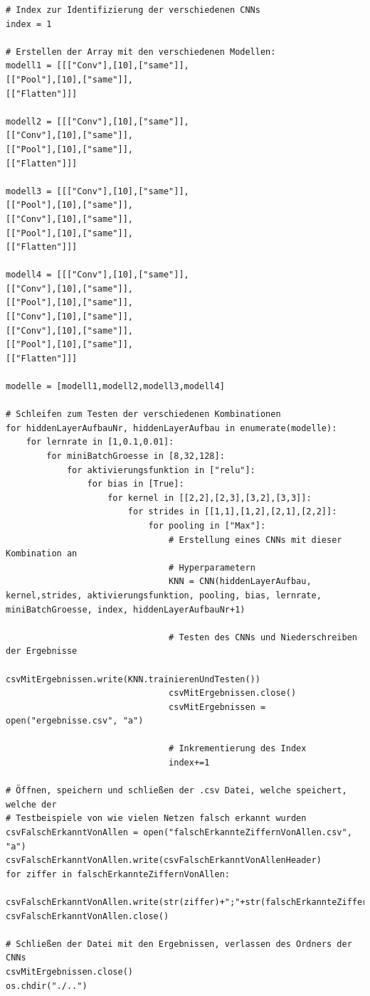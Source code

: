 \documentclass[a4paper,12pt,ngerman,oneside]{scrreprt}	%
\begin{document}
{\begin{lstlisting}
# Index zur Identifizierung der verschiedenen CNNs
index = 1

# Erstellen der Array mit den verschiedenen Modellen:
modell1 = [[["Conv"],[10],["same"]],
[["Pool"],[10],["same"]],
[["Flatten"]]]

modell2 = [[["Conv"],[10],["same"]],
[["Conv"],[10],["same"]],
[["Pool"],[10],["same"]],
[["Flatten"]]]

modell3 = [[["Conv"],[10],["same"]],
[["Pool"],[10],["same"]],
[["Conv"],[10],["same"]],
[["Pool"],[10],["same"]],
[["Flatten"]]]

modell4 = [[["Conv"],[10],["same"]],
[["Conv"],[10],["same"]],
[["Pool"],[10],["same"]],
[["Conv"],[10],["same"]],
[["Conv"],[10],["same"]],
[["Pool"],[10],["same"]],
[["Flatten"]]]

modelle = [modell1,modell2,modell3,modell4]

# Schleifen zum Testen der verschiedenen Kombinationen
for hiddenLayerAufbauNr, hiddenLayerAufbau in enumerate(modelle):
	for lernrate in [1,0.1,0.01]:
		for miniBatchGroesse in [8,32,128]:
			for aktivierungsfunktion in ["relu"]:
				for bias in [True]:
					for kernel in [[2,2],[2,3],[3,2],[3,3]]:
						for strides in [[1,1],[1,2],[2,1],[2,2]]:
							for pooling in ["Max"]:
								# Erstellung eines CNNs mit dieser Kombination an
								# Hyperparametern
								KNN = CNN(hiddenLayerAufbau, kernel,strides, aktivierungsfunktion, pooling, bias, lernrate, miniBatchGroesse, index, hiddenLayerAufbauNr+1)
								
								# Testen des CNNs und Niederschreiben der Ergebnisse
								csvMitErgebnissen.write(KNN.trainierenUndTesten())
								csvMitErgebnissen.close()
								csvMitErgebnissen = open("ergebnisse.csv", "a")
								
								# Inkrementierung des Index
								index+=1

# Öffnen, speichern und schließen der .csv Datei, welche speichert, welche der
# Testbeispiele von wie vielen Netzen falsch erkannt wurden
csvFalschErkanntVonAllen = open("falschErkannteZiffernVonAllen.csv", "a")
csvFalschErkanntVonAllen.write(csvFalschErkanntVonAllenHeader)
for ziffer in falschErkannteZiffernVonAllen:
	csvFalschErkanntVonAllen.write(str(ziffer)+";"+str(falschErkannteZiffernVonAllen[ziffer])+"\n")
csvFalschErkanntVonAllen.close()

# Schließen der Datei mit den Ergebnissen, verlassen des Ordners der CNNs
csvMitErgebnissen.close()
os.chdir("./..")
			\end{lstlisting}}
		
\end{document}
